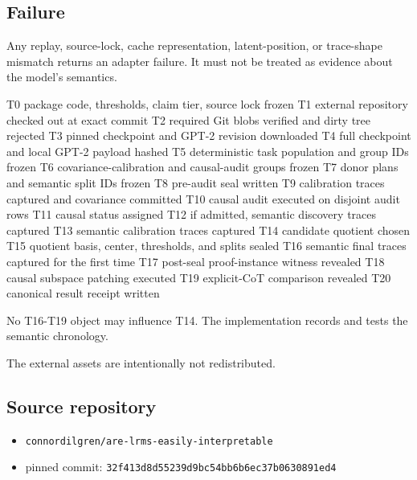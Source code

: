 \documentclass[
  10pt,
]{article}
\newenvironment{Shaded}{}{}
\newcommand{\NormalTok}[1]{#1}
\providecommand{\tightlist}{%
  \setlength{\itemsep}{0pt}\setlength{\parskip}{0pt}}
\begin{document}
\subsection{Failure}\label{failure}

Any replay, source-lock, cache representation, latent-position, or
trace-shape mismatch returns an adapter failure. It must not be treated
as evidence about the model's semantics.

\begin{Shaded}
\begin{Highlighting}[]
\NormalTok{T0  package code, thresholds, claim tier, source lock frozen}
\NormalTok{T1  external repository checked out at exact commit}
\NormalTok{T2  required Git blobs verified and dirty tree rejected}
\NormalTok{T3  pinned checkpoint and GPT{-}2 revision downloaded}
\NormalTok{T4  full checkpoint and local GPT{-}2 payload hashed}
\NormalTok{T5  deterministic task population and group IDs frozen}
\NormalTok{T6  covariance{-}calibration and causal{-}audit groups frozen}
\NormalTok{T7  donor plans and semantic split IDs frozen}
\NormalTok{T8  pre{-}audit seal written}
\NormalTok{T9  calibration traces captured and covariance committed}
\NormalTok{T10 causal audit executed on disjoint audit rows}
\NormalTok{T11 causal status assigned}
\NormalTok{T12 if admitted, semantic discovery traces captured}
\NormalTok{T13 semantic calibration traces captured}
\NormalTok{T14 candidate quotient chosen}
\NormalTok{T15 quotient basis, center, thresholds, and splits sealed}
\NormalTok{T16 semantic final traces captured for the first time}
\NormalTok{T17 post{-}seal proof{-}instance witness revealed}
\NormalTok{T18 causal subspace patching executed}
\NormalTok{T19 explicit{-}CoT comparison revealed}
\NormalTok{T20 canonical result receipt written}
\end{Highlighting}
\end{Shaded}

No T16-T19 object may influence T14. The implementation records and
tests the semantic chronology.

The external assets are intentionally not redistributed.

\subsection{Source repository}\label{source-repository}

\begin{itemize}
\tightlist
\item
  \texttt{connordilgren/are-lrms-easily-interpretable}
\item
  pinned commit: \texttt{32f413d8d55239d9bc54bb6b6ec37b0630891ed4}
\end{itemize}
\end{document}
